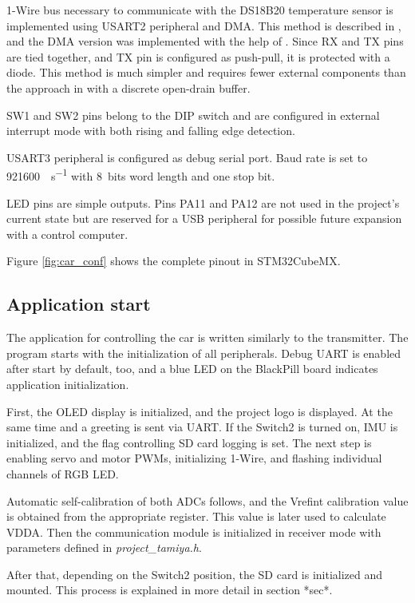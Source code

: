 1-Wire bus necessary to communicate with the DS18B20 temperature sensor is implemented using USART2 peripheral and DMA. This method is described in \cite{1wire_uart}, and the DMA version was implemented with the help of \cite{1wire_uart_imp}. Since RX and TX pins are tied together, and TX pin is configured as push-pull, it is protected with a diode. This method is much simpler and requires fewer external components than the approach in \cite{1wire_uart} with a discrete open-drain buffer.

SW1 and SW2 pins belong to the DIP switch and are configured in external interrupt mode with both rising and falling edge detection.

USART3 peripheral is configured as debug serial port. Baud rate is set to \SI{921600}{\bit\per\second} with 8~bits word length and one stop bit.

LED pins are simple outputs. Pins PA11 and PA12 are not used in the project's current state but are reserved for a USB peripheral for possible future expansion with a control computer.

Figure \ref{fig:car_conf} shows the complete pinout in STM32CubeMX.

\subsection{Application start}
The application for controlling the car is written similarly to the transmitter. The program starts with the initialization of all peripherals. Debug UART is enabled after start by default, too, and a blue LED on the BlackPill board indicates application initialization.

First, the OLED display is initialized, and the project logo is displayed. At the same time and a greeting is sent via UART. If the Switch2 is turned on, IMU is initialized, and the flag controlling SD card logging is set. The next step is enabling servo and motor PWMs, initializing 1-Wire, and flashing individual channels of RGB LED.

Automatic self-calibration of both ADCs follows, and the Vrefint calibration value is obtained from the appropriate register. This value is later used to calculate VDDA. Then the communication module is initialized in receiver mode with parameters defined in \textit{project\_tamiya.h}.

After that, depending on the Switch2 position, the SD card is initialized and mounted. This process is explained in more detail in section *sec*.

